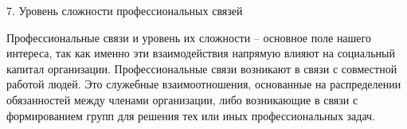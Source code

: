 \begin{frame}{7. Уровень сложности профессиональных связей}

\tiny 
Профессиональные связи и уровень их сложности – основное поле нашего интереса, так как именно эти взаимодействия напрямую влияют на социальный капитал организации. Профессиональные связи  возникают в связи с совместной работой людей. Это служебные взаимоотношения, основанные на распределении обязанностей между членами организации, либо  возникающие в связи с формированием  групп для решения тех или иных профессиональных задач.
\end{frame}


